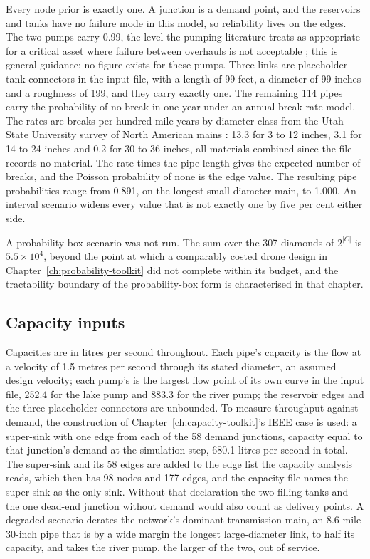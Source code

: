 \documentclass[12pt]{report}
\begin{document}
Every node prior is exactly one. A junction is a demand point, and the reservoirs and tanks have no failure mode in this
model, so reliability lives on the edges.
The two pumps carry 0.99, the level the pumping literature treats as appropriate for a
critical asset where failure between overhauls is not acceptable \cite{butts2022pumpreliability};
this is general guidance; no figure exists for these pumps. Three links are placeholder
tank connectors in the input file, with a length of 99 feet, a diameter of 99 inches and a
roughness of 199, and they carry exactly one. The remaining 114 pipes carry the probability of no break in one year under an annual
break-rate model. The rates are breaks per hundred mile-years by diameter class from the
Utah State University survey of North American mains \cite{barfuss2023breakrates}: 13.3
for 3 to 12 inches, 3.1 for 14 to 24 inches and 0.2 for 30 to 36 inches, all materials
combined since the file records no material. The rate times the pipe length gives the
expected number of breaks, and the Poisson probability of none is the edge value. The resulting pipe probabilities range from 0.891, on the longest
small-diameter main, to 1.000. An interval scenario widens every value that is not exactly
one by five per cent either side.

A probability-box scenario was not run. The sum over the 307 diamonds of $2^{|C|}$ is
$5.5 \times 10^{4}$, beyond the point at which a comparably costed drone design in
Chapter~\ref{ch:probability-toolkit} did not complete within its budget, and the
tractability boundary of the probability-box form is characterised in that chapter.

\subsection{Capacity inputs}

Capacities are in litres per second throughout. Each pipe's capacity is the flow at a
velocity of 1.5 metres per second through its stated diameter, an assumed design velocity; each pump's is the largest flow point of
its own curve in the input file, 252.4 for the lake pump and 883.3 for the river pump; the
reservoir edges and the three placeholder connectors are unbounded. To measure throughput
against demand, the construction of Chapter~\ref{ch:capacity-toolkit}'s IEEE case is used:
a super-sink with one edge from each of the 58 demand junctions, capacity equal to that
junction's demand at the simulation step, 680.1 litres per second in total. The super-sink
and its 58 edges are added to the edge list the capacity analysis reads, which then has 98
nodes and 177 edges, and the capacity file names the super-sink as the only sink. Without
that declaration the two filling tanks and the one dead-end junction without demand would
also count as delivery points. A degraded scenario derates the network's
dominant transmission main, an 8.6-mile 30-inch pipe that is by a wide margin the longest
large-diameter link, to half its capacity, and takes the river pump, the larger of the two,
out of service.
\end{document}
